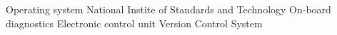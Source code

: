 		{Operating system}
		{National Instite of Standards and Technology}
		{On-board diagnostics}
		{Electronic control unit}
		{Version Control System}